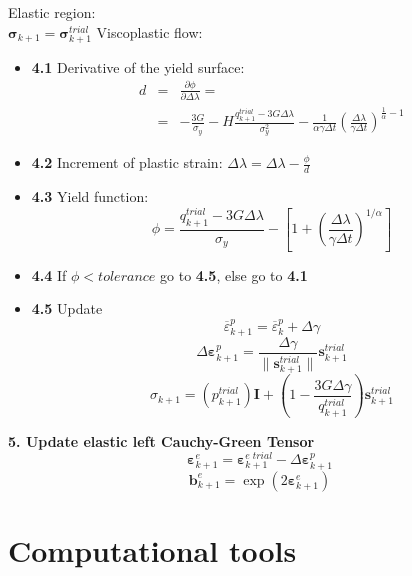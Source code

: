 \documentclass[applsci,journal,article,submit,moreauthors,pdftex]{Definitions/mdpi}
\begin{document}
\begin{algorithm}[ht]
\begin{algorithmic}
 Elastic region:\\
\vspace{0.15cm}
$\mathbf{\sigma}_{k+1}=\mathbf{\sigma}^{trial}_{k+1}$
\vspace{0.3cm}
\ELSE   Viscoplastic flow:
\begin{itemize}
\item\textbf{4.1} Derivative of the yield surface:
\begin{eqnarray}
d&=&\frac{\partial\phi}{\partial\Delta\lambda}=\nonumber\\
&=&- \frac{3G}{\sigma_y} - H \frac{q^{trial}_{k+1}  - 3G\Delta\lambda}{\sigma^2_y} - \frac{1}{\alpha\gamma\Delta t}\left( \frac{\Delta \lambda}{\gamma \Delta  t} \right)^{\frac{1}{\alpha}-1}\nonumber
\end{eqnarray}
\item\textbf{4.2} Increment of plastic strain:
$
\Delta\lambda=\Delta\lambda-\frac{\phi}{d}
$
\item\textbf{4.3} Yield function:
$$
\phi= \frac{q^{trial}_{k+1}  - 3G\Delta\lambda}{\sigma_y} -\left[  1 + \left( \frac{\Delta \lambda}{\gamma \Delta  t} \right)^{1/\alpha} \right]
$$
\item\textbf{4.4} If $\phi < tolerance$ go to \textbf{4.5}, else go to  \textbf{4.1}
\item\textbf{4.5} Update
$$
\overline{\varepsilon}^p_{k+1}=\overline{\varepsilon}^p_{k}+\Delta\gamma
$$
$$
\Delta\boldsymbol{\varepsilon}_{k+1}^{p}= \frac{\Delta\gamma}{\|\textbf{s}^{trial}_{k+1}\|}\mathbf{s}^{trial}_{k+1}
$$
$$
\sigma_{k+1}=\left(p^{trial}_{k+1} \right)\mathbf{I}+\left(1-\frac{3G\Delta\gamma}{q^{trial}_{k+1} }\right)\textbf{s}^{trial}_{k+1}
$$
\end{itemize}
\ENDIF
%
\State \textbf{5. Update elastic left Cauchy-Green Tensor}
$$
\boldsymbol{\varepsilon}_{k+1}^{e}= \boldsymbol{\varepsilon}^{e\; trial}_{k+1}-\Delta\boldsymbol{\varepsilon}_{k+1}^{p}
$$
$$
\mathbf{b}_{k+1}^{e}=\exp (2 \boldsymbol{\varepsilon}_{k+1}^{e})
$$
\end{algorithmic}
\end{algorithm}

\section{Computational tools}
\end{document}
